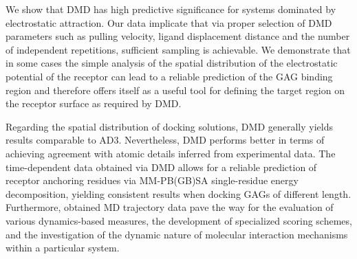 We show that DMD has high predictive significance for systems dominated by
electrostatic attraction. Our data implicate that via proper selection of DMD
parameters such as pulling velocity, ligand displacement distance and the number
of independent repetitions, sufficient sampling is achievable. We demonstrate
that in some cases the simple analysis of the spatial distribution of the
electrostatic potential of the receptor can lead to a reliable prediction of the
GAG binding region and therefore offers itself as a useful tool for defining the
target region on the receptor surface as required by DMD.

Regarding the spatial distribution of docking solutions, DMD generally yields
results comparable to AD3. Nevertheless, DMD performs better in terms of
achieving agreement with atomic details inferred from experimental data. The
time-dependent data obtained via DMD allows for a reliable prediction of
receptor anchoring residues via MM-PB(GB)SA single-residue energy decomposition,
yielding consistent results when docking GAGs of different length. Furthermore,
obtained MD trajectory data pave the way for the evaluation of various
dynamics-based measures, the development of specialized scoring schemes, and the
investigation of the dynamic nature of molecular interaction mechanisms within a
particular system.
